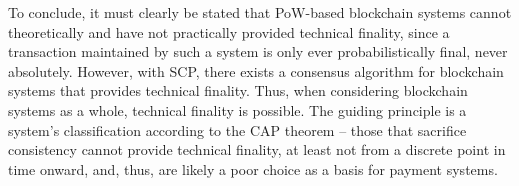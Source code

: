 To conclude, it must clearly be stated that PoW-based blockchain systems cannot theoretically and have not practically provided technical finality, since a transaction maintained by such a system is only ever probabilistically final, never absolutely.
However, with SCP, there exists a consensus algorithm for blockchain systems that provides technical finality.
Thus, when considering blockchain systems as a whole, technical finality is possible.
The guiding principle is a system's classification according to the CAP theorem -- those that sacrifice consistency cannot provide technical finality, at least not from a discrete point in time onward, and, thus, are likely a poor choice as a basis for payment systems.
